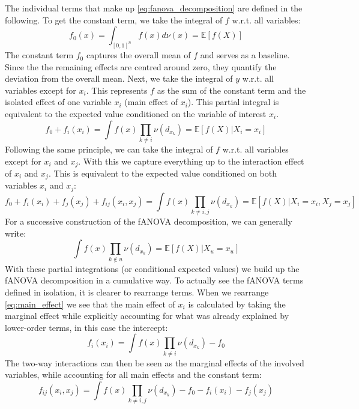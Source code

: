 The individual terms that make up \autoref{eq:fanova_decomposition} are defined in the following.
To get the constant term, we take the integral of $f$ w.r.t. all variables:
\begin{equation}
    f_{0}(x) = \int_{[0, 1]^n} f(x) d\nu(x) = \mathbb{E}[f(X)]
    \label{eq:intercapt}
\end{equation}
The constant term $f_0$ captures the overall mean of $f$ and serves as a baseline. Since the the remaining effects are centred around zero, they quantify the deviation from the overall mean.  Next, we take the integral of $y$ w.r.t. all variables except for $x_i$. This represents $f$ as the sum of the constant term and the isolated effect of one variable $x_i$ (main effect of $x_i$). This partial integral is equivalent to the expected value conditioned on the variable of interest $x_i$.
\begin{equation}
    f_0 + f_i(x_i) = \int f(x) \prod_{k \neq i} \nu (d_{x_{k}}) = \mathbb{E}[f(X) | X_i = x_i]
    \label{eq:main_effect}
\end{equation}
Following the same principle, we can take the integral of $f$ w.r.t. all variables except for $x_i$ and $x_j$. With this we capture everything up to the interaction effect of $x_i$ and $x_j$. This is equivalent to the expected value conditioned on both variables $x_i$ and $x_j$:
\begin{equation}
    f_0 + f_i(x_i) + f_j(x_j) + f_{ij}(x_i,x_j) = \int f(x) \prod_{k \neq i,j} \nu(d_{x_{k}}) = \mathbb{E}[f(X) | X_i = x_i, X_j = x_j]
    \label{eq:interaction_effects}
\end{equation}
For a successive construction of the fANOVA decomposition, we can generally write:
\begin{equation}
    \int f(x) \prod_{k \notin u} \nu(d_{x_{k}}) = \mathbb{E}[f(X) | X_u = x_u]
    \label{eq:fanova_component}
\end{equation}
With these partial integrations (or conditional expected values) we build up the fANOVA decomposition in a cumulative way. To actually see the fANOVA terms defined in isolation, it is clearer to rearrange terms. When we rearrange \autoref{eq:main_effect} we see that the main effect of $x_i$ is calculated by taking the marginal effect while explicitly accounting for what was already explained by lower-order terms, in this case the intercept:
\begin{equation}
    f_i(x_i) = \int f(x) \prod_{k \neq i} \nu(d_{x_{k}}) - f_0
    \label{eq:main_effect_rearranged}
\end{equation}
The two-way interactions can then be seen as the marginal effects of the involved variables, while accounting for all main effects and the constant term:
\begin{equation}
    f_{ij}(x_i,x_j) = \int f(x) \prod_{k \neq i,j} \nu(d_{x_{k}}) - f_0 - f_i(x_i) - f_j(x_j) 
    \label{eq:interaction_effects}
\end{equation}

